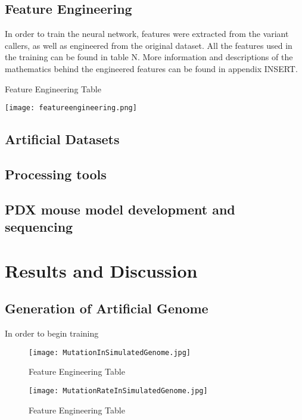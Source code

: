 \documentclass{article}
\begin{document}
\subsection{Feature Engineering}
In order to train the neural network, features were extracted from the variant callers, as well as engineered from the original dataset. All the features used in the training can be found in table N. More information and descriptions of the mathematics behind the engineered features can be found in appendix INSERT.

\begin{table}[]
\caption{Feature Engineering Table}
\texttt{[image: featureengineering.png]}
\centering
\end{table}


\subsection{Artificial Datasets}

\subsection{Processing tools}

\subsection{PDX mouse model development and sequencing}


\section{Results and Discussion}
\subsection{Generation of Artificial Genome}
In order to begin training 

\begin{figure}[H]
\caption{Feature Engineering Table}
\texttt{[image: MutationInSimulatedGenome.jpg]}
\centering
\end{figure}

\begin{figure}[H]
\caption{Feature Engineering Table}
\texttt{[image: MutationRateInSimulatedGenome.jpg]}
\centering
\end{figure}
\end{document}
